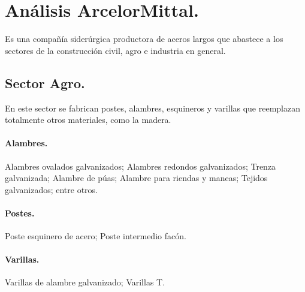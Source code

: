 \documentclass[12pt,a4paper]{article}
\begin{document}
\section{Análisis ArcelorMittal.}
Es una compañía siderúrgica productora de aceros largos que abastece a los sectores de la construcción civil, agro e industria en general.

\subsection{Sector Agro.}
En este sector se fabrican postes, alambres, esquineros y varillas que reemplazan totalmente otros materiales, como la madera.

\paragraph{Alambres.}
Alambres ovalados galvanizados; Alambres redondos galvanizados; Trenza galvanizada; Alambre de púas; Alambre para riendas y maneas; Tejidos galvanizados; entre otros.

\paragraph{Postes.}
Poste esquinero de acero; Poste intermedio facón.

\paragraph{Varillas.}
Varillas de alambre galvanizado; Varillas T.
\end{document}
